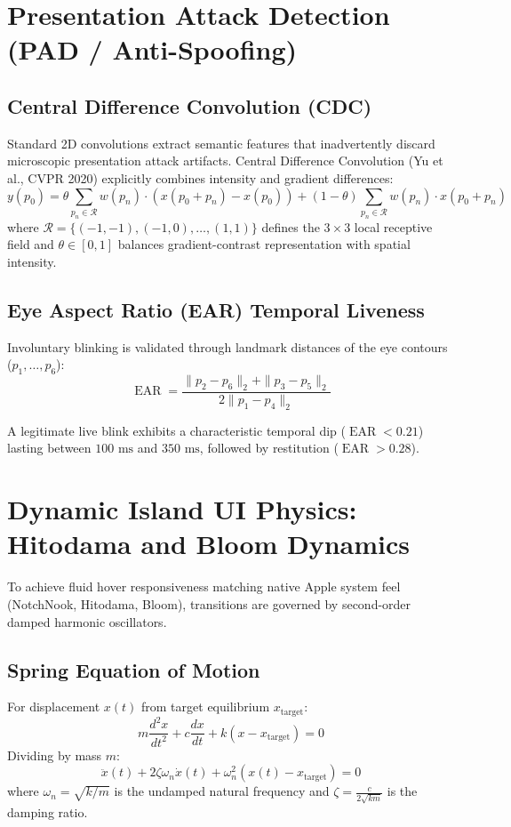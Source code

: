 \documentclass[11pt,a4paper]{article}
\begin{document}
\section{Presentation Attack Detection (PAD / Anti-Spoofing)}

\subsection{Central Difference Convolution (CDC)}
Standard 2D convolutions extract semantic features that inadvertently discard microscopic presentation attack artifacts. Central Difference Convolution (Yu et al., CVPR 2020) explicitly combines intensity and gradient differences:
\begin{equation}
y(p_0) = \theta \sum_{p_n \in \mathcal{R}} w(p_n) \cdot (x(p_0 + p_n) - x(p_0)) + (1 - \theta) \sum_{p_n \in \mathcal{R}} w(p_n) \cdot x(p_0 + p_n)
\end{equation}
where $\mathcal{R} = \{(-1, -1), (-1, 0), \dots, (1, 1)\}$ defines the $3 \times 3$ local receptive field and $\theta \in [0, 1]$ balances gradient-contrast representation with spatial intensity.

\subsection{Eye Aspect Ratio (EAR) Temporal Liveness}
Involuntary blinking is validated through landmark distances of the eye contours ($p_1, \dots, p_6$):
\begin{equation}
\operatorname{EAR} = \frac{\|p_2 - p_6\|_2 + \|p_3 - p_5\|_2}{2 \|p_1 - p_4\|_2}
\end{equation}

A legitimate live blink exhibits a characteristic temporal dip ($\operatorname{EAR} < 0.21$) lasting between $100\text{ ms}$ and $350\text{ ms}$, followed by restitution ($\operatorname{EAR} > 0.28$).

\section{Dynamic Island UI Physics: Hitodama and Bloom Dynamics}

To achieve fluid hover responsiveness matching native Apple system feel (NotchNook, Hitodama, Bloom), transitions are governed by second-order damped harmonic oscillators.

\subsection{Spring Equation of Motion}
For displacement $x(t)$ from target equilibrium $x_{\text{target}}$:
\begin{equation}
m \frac{d^2 x}{dt^2} + c \frac{dx}{dt} + k (x - x_{\text{target}}) = 0
\end{equation}
Dividing by mass $m$:
\begin{equation}
\ddot{x}(t) + 2 \zeta \omega_n \dot{x}(t) + \omega_n^2 (x(t) - x_{\text{target}}) = 0
\end{equation}
where $\omega_n = \sqrt{k/m}$ is the undamped natural frequency and $\zeta = \frac{c}{2\sqrt{km}}$ is the damping ratio.
\end{document}
